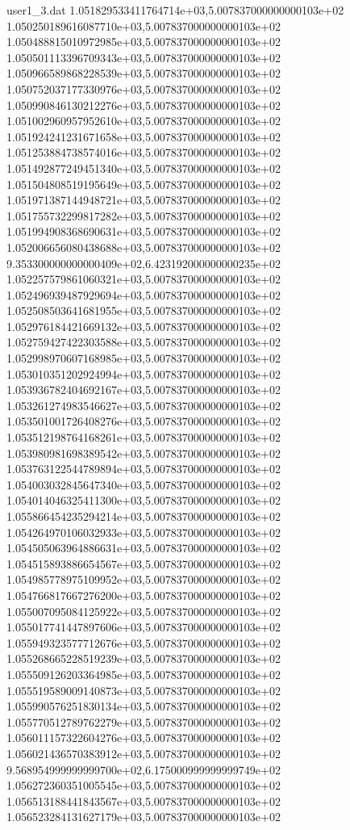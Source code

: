 \begin{filecontents}{user1_3.dat}
1.051829533411764714e+03,5.007837000000000103e+02
1.050250189616087710e+03,5.007837000000000103e+02
1.050488815010972985e+03,5.007837000000000103e+02
1.050501113396709343e+03,5.007837000000000103e+02
1.050966589868228539e+03,5.007837000000000103e+02
1.050752037177330976e+03,5.007837000000000103e+02
1.050990846130212276e+03,5.007837000000000103e+02
1.051002960957952610e+03,5.007837000000000103e+02
1.051924241231671658e+03,5.007837000000000103e+02
1.051253884738574016e+03,5.007837000000000103e+02
1.051492877249451340e+03,5.007837000000000103e+02
1.051504808519195649e+03,5.007837000000000103e+02
1.051971387144948721e+03,5.007837000000000103e+02
1.051755732299817282e+03,5.007837000000000103e+02
1.051994908368690631e+03,5.007837000000000103e+02
1.052006656080438688e+03,5.007837000000000103e+02
9.353300000000000409e+02,6.423192000000000235e+02
1.052257579861060321e+03,5.007837000000000103e+02
1.052496939487929694e+03,5.007837000000000103e+02
1.052508503641681955e+03,5.007837000000000103e+02
1.052976184421669132e+03,5.007837000000000103e+02
1.052759427422303588e+03,5.007837000000000103e+02
1.052998970607168985e+03,5.007837000000000103e+02
1.053010351202924994e+03,5.007837000000000103e+02
1.053936782404692167e+03,5.007837000000000103e+02
1.053261274983546627e+03,5.007837000000000103e+02
1.053501001726408276e+03,5.007837000000000103e+02
1.053512198764168261e+03,5.007837000000000103e+02
1.053980981698389542e+03,5.007837000000000103e+02
1.053763122544789894e+03,5.007837000000000103e+02
1.054003032845647340e+03,5.007837000000000103e+02
1.054014046325411300e+03,5.007837000000000103e+02
1.055866454235294214e+03,5.007837000000000103e+02
1.054264970106032933e+03,5.007837000000000103e+02
1.054505063964886631e+03,5.007837000000000103e+02
1.054515893886654567e+03,5.007837000000000103e+02
1.054985778975109952e+03,5.007837000000000103e+02
1.054766817667276200e+03,5.007837000000000103e+02
1.055007095084125922e+03,5.007837000000000103e+02
1.055017741447897606e+03,5.007837000000000103e+02
1.055949323577712676e+03,5.007837000000000103e+02
1.055268665228519239e+03,5.007837000000000103e+02
1.055509126203364985e+03,5.007837000000000103e+02
1.055519589009140873e+03,5.007837000000000103e+02
1.055990576251830134e+03,5.007837000000000103e+02
1.055770512789762279e+03,5.007837000000000103e+02
1.056011157322604276e+03,5.007837000000000103e+02
1.056021436570383912e+03,5.007837000000000103e+02
9.568954999999999700e+02,6.175000999999999749e+02
1.056272360351005545e+03,5.007837000000000103e+02
1.056513188441843567e+03,5.007837000000000103e+02
1.056523284131627179e+03,5.007837000000000103e+02

\end{filecontents}
